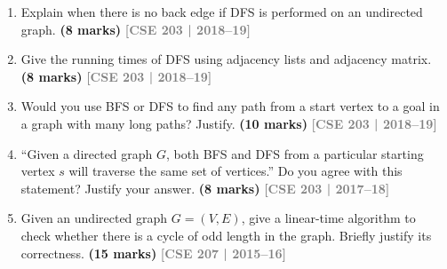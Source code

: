\documentclass[12pt,a3paper]{article}
\newcommand{\yr}[1]{\hfill\textcolor{gray}{\small\textbf{[#1]}}}
\newcommand{\mk}[1]{\textcolor{orange!70!black}{\small\textbf{(#1 marks)}}}
\begin{document}
\begin{enumerate}
\begin{center}
\end{center}

\begin{center}
\end{center}


\item Explain when there is no back edge if DFS is performed on an undirected
graph. \mk{8}
\yr{CSE 203 | 2018--19}

\item Give the running times of DFS using adjacency lists and adjacency matrix.
\mk{8}
\yr{CSE 203 | 2018--19}

\item Would you use BFS or DFS to find any path from a start vertex to a goal
in a graph with many long paths? Justify. \mk{10}
\yr{CSE 203 | 2018--19}

\item ``Given a directed graph $G$, both BFS and DFS from a particular starting vertex $s$ will traverse the same set of vertices.'' Do you agree with this statement? Justify your answer. \mk{8}
\yr{CSE 203 | 2017--18}

\item Given an undirected graph $G = (V, E)$, give a linear-time algorithm to check whether there is a cycle of odd length in the graph. Briefly justify its correctness. \mk{15}
\yr{CSE 207 | 2015--16}


\end{enumerate}
\end{document}

